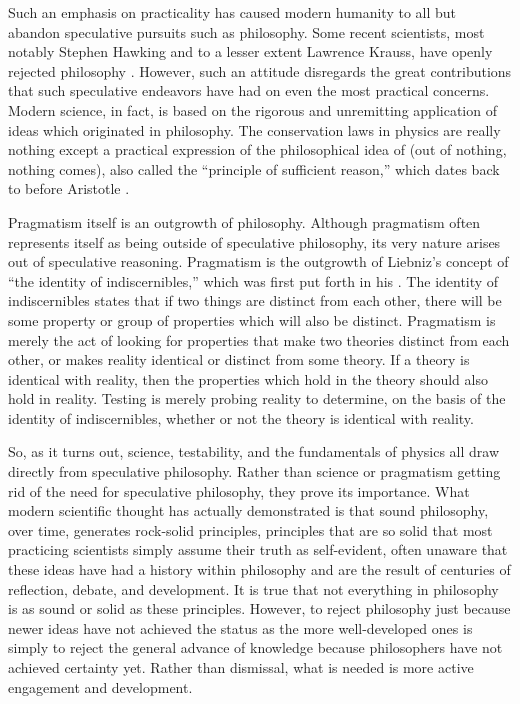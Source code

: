 Such an emphasis on practicality has caused modern humanity to all but abandon speculative pursuits such as philosophy.  
Some recent scientists, most notably Stephen Hawking and to a lesser extent Lawrence Krauss, have openly rejected philosophy \citep{warman2011, andersen2012}.
However, such an attitude disregards the great contributions that such speculative endeavors have had on even the most practical concerns.  Modern science, in fact, is based on the rigorous and unremitting application of ideas which originated in philosophy.  The conservation laws in physics are really nothing except a practical expression of the philosophical idea of  (out of nothing, nothing comes), also called the ``principle of sufficient reason,'' which dates back to before Aristotle \citep{psr2011}.

Pragmatism itself is an outgrowth of philosophy.  Although pragmatism often represents itself as being outside of speculative philosophy,  its very nature arises out of speculative reasoning.  Pragmatism is the outgrowth of Liebniz's concept of ``the identity of indiscernibles,'' which was first put forth in his  \citep{ident2012}.  The identity of indiscernibles states that if two things are distinct from each other, there will be some property or group of properties which will also be distinct.  Pragmatism is merely the act of looking for properties that make two theories distinct from each other, or makes reality identical or distinct from some theory.  If a theory is identical with reality, then the properties which hold in the theory should also hold in reality.  Testing is merely probing reality to determine, on the basis of the identity of indiscernibles, whether or not the theory is identical with reality.

So, as it turns out, science, testability, and the fundamentals of physics all draw directly from speculative philosophy.  Rather than science or pragmatism getting rid of the need for speculative philosophy, they prove its importance.  What modern scientific thought has actually demonstrated is that sound philosophy, over time, generates rock-solid principles, principles that are so solid that most practicing scientists simply assume their truth as self-evident, often unaware that these ideas have had a history within philosophy and are the result of centuries of reflection, debate, and development.  It is true that not everything in philosophy is as sound or solid as these principles.  However, to reject philosophy just because newer ideas have not achieved the status as the more well-developed ones is simply to reject the general advance of knowledge because philosophers have not achieved certainty yet.  Rather than dismissal, what is needed is more active engagement and development.

